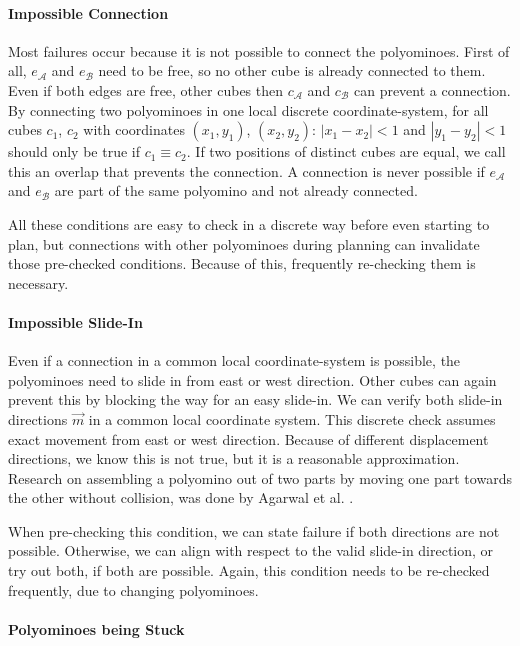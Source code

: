 \paragraph{Impossible Connection}

Most failures occur because it is not possible to connect the polyominoes.
First of all, $e_\mathcal{A}$ and $e_\mathcal{B}$ need to be free, so no other cube is already connected to them.
Even if both edges are free, other cubes then $c_\mathcal{A}$ and $c_\mathcal{B}$ can prevent a connection.
By connecting two polyominoes in one local discrete coordinate-system, for all cubes $c_1$, $c_2$ with coordinates $(x_1, y_1)$, $(x_2, y_2)$: $\left|x_1 - x_2\right| < 1$ and $\left|y_1 - y_2\right| < 1$ should only be true if $c_1 \equiv c_2$.
If two positions of distinct cubes are equal, we call this an overlap that prevents the connection.
A connection is never possible if $e_\mathcal{A}$ and $e_\mathcal{B}$ are part of the same polyomino and not already connected.

All these conditions are easy to check in a discrete way before even starting to plan, but connections with other polyominoes during planning can invalidate those pre-checked conditions.
Because of this, frequently re-checking them is necessary.

\paragraph{Impossible Slide-In}

Even if a connection in a common local coordinate-system is possible, the polyominoes need to slide in from east or west direction.
Other cubes can again prevent this by blocking the way for an easy slide-in.
We can verify both slide-in directions $\vec{m}$ in a common local coordinate system.
This discrete check assumes exact movement from east or west direction.
Because of different displacement directions, we know this is not true, but it is a reasonable approximation.
Research on assembling a polyomino out of two parts by moving one part towards the other without collision, was done by Agarwal et al. \cite{agarwal2021}. 

When pre-checking this condition, we can state failure if both directions are not possible.
Otherwise, we can align with respect to the valid slide-in direction, or try out both, if both are possible.
Again, this condition needs to be re-checked frequently, due to changing polyominoes.

\paragraph{Polyominoes being Stuck}

